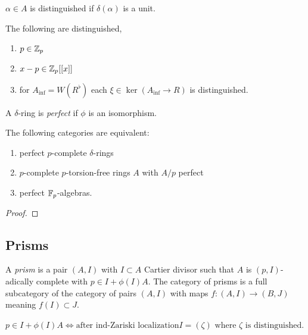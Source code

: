 \documentclass[12pt]{article}
\begin{document}
\begin{defn}
$\alpha \in A$ is distinguished if $\delta(\alpha)$ is a unit.
\end{defn}

\begin{example}
The following are distinguished,
\begin{enumerate}
\item $p \in \mathbb{Z}_p$ 
\item $x - p \in \mathbb{Z}_p[[x]]$
\item for $A_{\inf} = W(R^{\flat})$ each $\xi \in \ker{(A_{\inf} \to R)}$ is distinguished.  
\end{enumerate}
\end{example}

\begin{defn}
A $\delta$-ring is \textit{perfect} if $\phi$ is an isomorphism.
\end{defn}

\begin{prop}
The following categories are equivalent:
\begin{enumerate}
\item perfect $p$-complete $\delta$-rings
\item $p$-complete $p$-torsion-free rings $A$ with $A / p$ perfect
\item perfect $\mathbb{F}_p$-algebras.
\end{enumerate}
\end{prop}

\begin{proof}

\end{proof}

\subsection{Prisms}

\begin{defn}
A \textit{prism} is a pair $(A, I)$ with $I \subset A$ Cartier divisor such that $A$ is $(p, I)$-adically complete with $p \in I + \phi(I) A$. The category of prisms is a full subcategory of the category of pairs $(A, I)$ with maps $f : (A, I) \to (B, J)$ meaning $f(I) \subset J$.
\end{defn}

\begin{rmk}
$p \in I + \phi(I) A \iff \text{after ind-Zariski localization} I = (\zeta) \text{ where } \zeta \text{ is distinguished}$.
\end{rmk}
\end{document}
